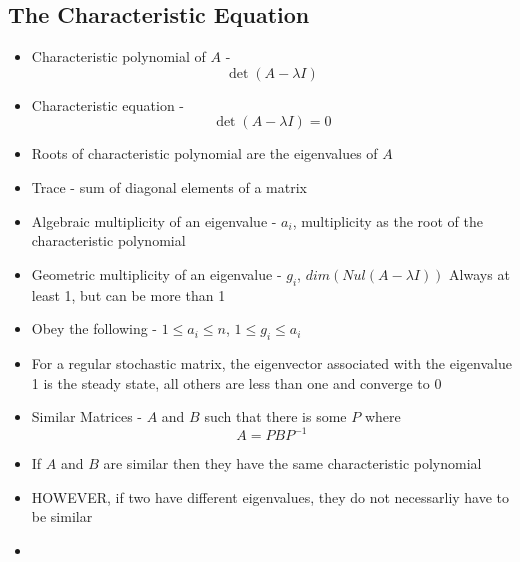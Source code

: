 \documentclass{article}
\begin{document}
\subsection{The Characteristic Equation}
\begin{itemize}
    \item Characteristic polynomial of \(A\) - \[\det{(A-\lambda I)}\]
    \item Characteristic equation - \[\det{(A-\lambda I)}=0\]
    \item Roots of characteristic polynomial are the eigenvalues of \(A\) 
    \item Trace - sum of diagonal elements of a matrix 
    \item Algebraic multiplicity of an eigenvalue - \(a_i\), multiplicity as the root of the characteristic polynomial 
    \item Geometric multiplicity of an eigenvalue - \(g_i\), \(dim(Nul(A-\lambda I))\) Always at least 1, but can be more than 1
    \item Obey the following - \(1\leq a_i \leq n\), \(1\leq g_i \leq a_i\)
    \item For a regular stochastic matrix, the eigenvector associated with the eigenvalue 1 is the steady state, all others are less than one and converge to 0
    \item Similar Matrices - \(A\) and \(B\) such that there is some \(P\) where \[A=PBP^{-1}\] 
    \item If \(A\) and \(B\) are similar then they have the same characteristic polynomial 
    \item HOWEVER, if two have different eigenvalues, they do not necessarliy have to be similar
    \item 
\end{itemize}
\end{document}
